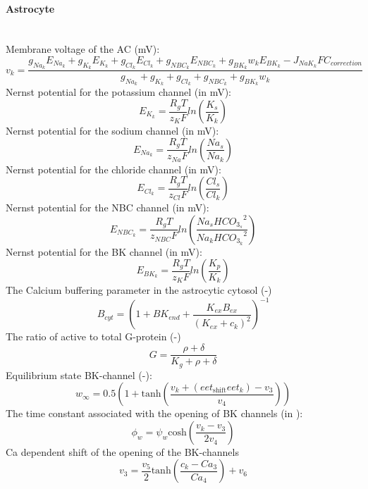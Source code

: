\paragraph{Astrocyte}~\\
%
Membrane voltage of the \gls{AC} (mV):
\begin{equation} \label{eq:v_k}
v_k=\frac{g_{Na_k}E_{Na_k}+g_{K_k}E_{K_k}+g_{Cl_k}E_{Cl_k}+g_{NBC_k}E_{NBC_k} + g_{BK_k}w_kE_{BK_k} -J_{NaK_k}F C_{correction} }{ g_{Na_k}+g_{K_k}+g_{Cl_k}+g_{NBC_k}+g_{BK_k}w_k }
\end{equation}
%
Nernst potential for the potassium channel (in mV):
\begin{equation} \label{eq:E_K}
E_{K_k}=\frac{R_gT}{z_K F}ln\left( \frac{K_s}{K_k}\right) 
\end{equation}
%
Nernst potential for the sodium channel (in mV):
\begin{equation} \label{eq:E_Na}
E_{Na_k}=\frac{R_gT}{z_{Na} F}ln\left( \frac{Na_s}{Na_k}\right) 
\end{equation}
%
Nernst potential for the chloride channel (in mV):
\begin{equation} \label{eq:E_Cl}
E_{Cl_k}=\frac{R_gT}{z_{Cl} F}ln\left( \frac{Cl_s}{Cl_k}\right) 
\end{equation}
%
Nernst potential for the NBC channel (in mV):
\begin{equation} \label{eq:E_NBC}
E_{NBC_k}=\frac{R_gT}{z_{NBC} F}ln\left( \frac{Na_s {HCO_{3_s}}^2}{Na_k {HCO_{3_k}}^2}\right) 
\end{equation}
Nernst potential for the BK channel (in mV):
\begin{equation} \label{eq:E_BK}
E_{BK_k}=\frac{R_gT}{z_K F}ln\left( \frac{K_p}{K_k}\right) 
\end{equation}
The Calcium buffering parameter in the astrocytic cytosol (-)
 \begin{equation} \label{eq:B_cyt}
 	B_{cyt}=\left(1+BK_{end}+ \frac{K_{ex}B_{ex}}{(K_{ex}+c_k)^2}\right)^{-1} 
 \end{equation}
The ratio of active to total G-protein (-)
\begin{equation} \label{eq:G}
   G=\frac{\rho+\delta}{K_g+\rho+\delta}
\end{equation}
Equilibrium state BK-channel (-):
\begin{equation} \label{eq:winf}
w_{\infty}=0.5 \left(1+\mathrm{tanh}\left(\frac{v_{k}+(eet_{\mathrm{shift}}eet_k)-v_{3} }{v_{4}} \right)  \right) 
\end{equation}
%
The time constant associated with the opening of BK channels	 (in \pers):
\begin{equation} \label{eq:phin}
\phi_{w}=\psi_{w}\mathrm{cosh}\left( \frac{v_{k}-v_{3}}{2v_{4}}\right) 
\end{equation}
\gls{Ca} dependent shift of the opening of the BK-channels
\begin{equation} \label{eq:v_3}
v_{3}=\frac{v_5}{2}\mathrm{tanh}\left( \frac{c_k-Ca_3}{Ca_4}\right)+v_6 
\end{equation}

